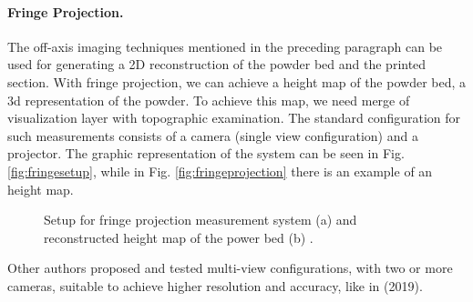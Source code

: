 \paragraph{Fringe Projection.} The off-axis imaging techniques mentioned in the preceding paragraph can be used for generating a 2D reconstruction of the powder bed and the printed section. With fringe projection, we can achieve a height map of the powder bed, a 3d representation of the powder. To achieve this map, we need merge of visualization layer with topographic examination. The standard configuration for such measurements consists of a camera (single view configuration) and a projector. The graphic representation of the system can be seen in Fig. \ref{fig:fringesetup}, while in Fig. \ref{fig:fringeprojection} there is an example of an height map.
\begin{figure}
    \centering
    \qquad
    \caption[Fringe projection.]{Setup for fringe projection measurement system (a) and reconstructed height map of the power bed (b) \cite{zhang_situ_2016}.}
\end{figure}
Other authors proposed and tested multi-view configurations, with two or more cameras, suitable to achieve higher resolution and accuracy, like in \citeauthor{kalms_new_2019} (2019).
